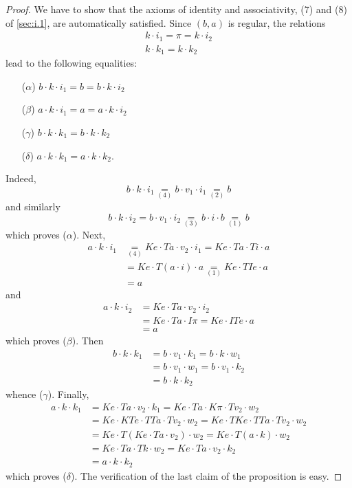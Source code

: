 \documentclass[fleqn]{article}
\newcommand{\oldpage}[1]{\marginpar{\footnotesize$\Big\vert$ \textit{p.~#1}}}
\begin{document}
\begin{proof}
  We have to show that the axioms of identity and associativity, (7) and (8) of \cref{sec:i.1}, are automatically satisfied.
  Since $(b,a)$ is regular, the relations
  \[
    \begin{gathered}
      k\cdot i_1
      = \pi
      = k\cdot i_2
    \\k\cdot k_1
      = k\cdot k_2
    \end{gathered}
  \]
  lead to the following equalities:
  \begin{enumerate}
    \item[($\alpha$)] $b\cdot k\cdot i_1=b=b\cdot k\cdot i_2$
    \item[($\beta$)] $a\cdot k\cdot i_1=a=a\cdot k\cdot i_2$
    \item[($\gamma$)] $b\cdot k\cdot k_1=b\cdot k\cdot k_2$
    \item[($\delta$)] $a\cdot k\cdot k_1=a\cdot k\cdot k_2$.
  \end{enumerate}
  Indeed,
  \oldpage{230}
  \[
    b\cdot k\cdot i_1
    \underset{(4)}{=} b\cdot v_1\cdot i_1
    \underset{(2)}{=} b
  \]
  and similarly
  \[
    b\cdot k\cdot i_2
    = b\cdot v_1\cdot i_2
    \underset{(3)}{=} b\cdot i\cdot b
    \underset{(1)}{=} b
  \]
  which proves ($\alpha$).
  Next,
  \[
    \begin{aligned}
      a\cdot k\cdot i_1
      &\underset{(4)}{=} Ke\cdot Ta\cdot v_2\cdot i_1
      = Ke\cdot Ta\cdot Ti\cdot a
    \\&= Ke\cdot T(a\cdot i)\cdot a
      \underset{(1)}{=} Ke\cdot TIe\cdot a
    \\&= a
    \end{aligned}
  \]
  and
  \[
    \begin{aligned}
      a\cdot k\cdot i_2
      &= Ke\cdot Ta\cdot v_2\cdot i_2
    \\&= Ke\cdot Ta\cdot I\pi
      =Ke\cdot ITe\cdot a
    \\&= a
    \end{aligned}
  \]
  which proves ($\beta$).
  Then
  \[
    \begin{aligned}
      b\cdot k\cdot k_1
      &= b\cdot v_1\cdot k_1
      = b\cdot k\cdot w_1
    \\&= b\cdot v_1\cdot w_1
      = b\cdot v_1\cdot k_2
    \\&= b\cdot k\cdot k_2
    \end{aligned}
  \]
  whence ($\gamma$).
  Finally,
  \[
    \begin{aligned}
      a\cdot k\cdot k_1
      &= Ke\cdot Ta\cdot v_2\cdot k_1
      = Ke\cdot Ta\cdot K\pi\cdot Tv_2\cdot w_2
    \\&= Ke\cdot KTe\cdot TTa\cdot Tv_2\cdot w_2
      = Ke\cdot TKe\cdot TTa\cdot Tv_2\cdot w_2
    \\&= Ke\cdot T(Ke\cdot Ta\cdot v_2)\cdot w_2
      = Ke\cdot T(a\cdot k)\cdot w_2
    \\&= Ke\cdot Ta\cdot Tk\cdot w_2
      = Ke\cdot Ta\cdot v_2\cdot k_2
    \\&= a\cdot k\cdot k_2
    \end{aligned}
  \]
  which proves ($\delta$).
  The verification of the last claim of the proposition is easy.
\end{proof}
\end{document}
